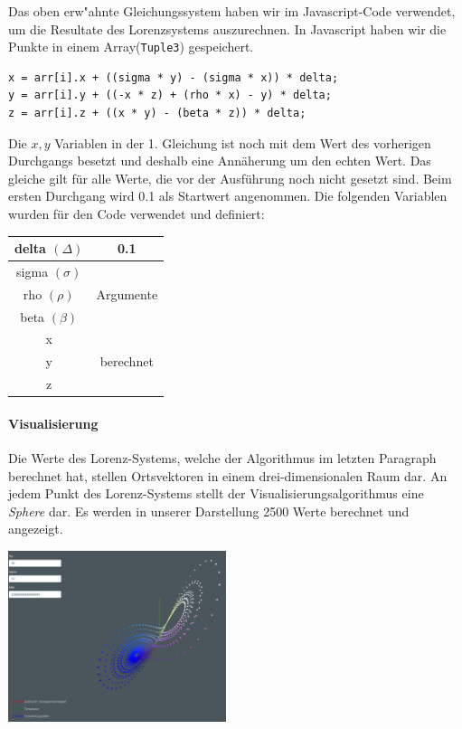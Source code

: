 \documentclass[implementation]{subfiles}
\begin{document}
	Das oben erw"ahnte Gleichungssystem haben wir im Javascript-Code verwendet, um die Resultate des Lorenzsystems auszurechnen. In Javascript haben wir die Punkte in einem Array(\texttt{Tuple3}) gespeichert.
	
	\begin{centerFigure}
		\begin{lstlisting}
x = arr[i].x + ((sigma * y) - (sigma * x)) * delta;
y = arr[i].y + ((-x * z) + (rho * x) - y) * delta;
z = arr[i].z + ((x * y) - (beta * z)) * delta;
		\end{lstlisting}
	\end{centerFigure}
	
	Die $ x, y $ Variablen in der 1. Gleichung ist noch mit dem Wert des vorherigen Durchgangs besetzt und deshalb eine Annäherung um den echten Wert. Das gleiche gilt für alle Werte, die vor der Ausführung noch nicht gesetzt sind. Beim ersten Durchgang wird 0.1 als Startwert angenommen. Die folgenden Variablen wurden für den Code verwendet und definiert:
	
	\begin{centerFigure}
		\begin{tabular}{| c | c |}
			\hline
			delta $ (\Delta) $ & 0.1 \\\hline
			sigma $ (\sigma) $ & \multirow{3}{*}{Argumente}\\
			rho $(\rho) $ & \\
			beta $ (\beta) $ & \\\hline
			x & \multirow{3}{*}{berechnet}\\
			y & \\
			z & \\\hline
		\end{tabular}
	\end{centerFigure}

	\paragraph{Visualisierung}
	Die Werte des Lorenz-Systems, welche der Algorithmus im letzten Paragraph berechnet hat, stellen Ortsvektoren in einem drei-dimensionalen Raum dar. An jedem Punkt des Lorenz-Systems stellt der Visualisierungsalgorithmus eine \textit{Sphere} dar. Es werden in unserer Darstellung 2500 Werte berechnet und angezeigt.
	
	\begin{centerFigure}
		\includegraphics[height=5cm]{assets/Visualisierung}
	\end{centerFigure}
\end{document}
